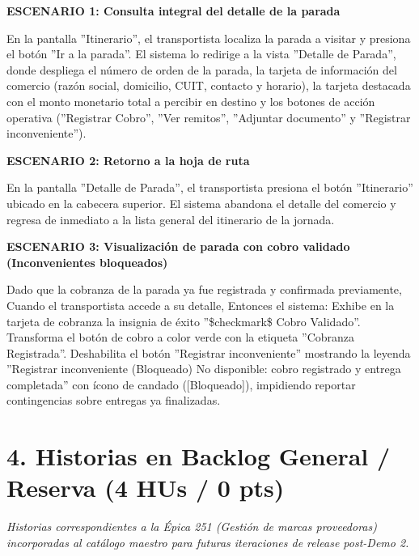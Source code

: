 \documentclass[a4paper,9pt]{article}
\begin{document}
\begin{tcolorbox}
{\footnotesize
\noindent\textbf{\textcolor{secondarydark}{ESCENARIO 1:  Consulta integral del detalle de la parada}}\par\vspace{1pt}
En la pantalla ''Itinerario'', el transportista localiza la parada a visitar y presiona el botón ''Ir a la parada''. El sistema lo redirige a la vista ''Detalle de Parada'', donde despliega el número de orden de la parada, la tarjeta de información del comercio (razón social, domicilio, CUIT, contacto y horario), la tarjeta destacada con el monto monetario total a percibir en destino y los botones de acción operativa (''Registrar Cobro'', ''Ver remitos'', ''Adjuntar documento'' y ''Registrar inconveniente'').\par\vspace{2.5pt}
\noindent\textbf{\textcolor{secondarydark}{ESCENARIO 2:  Retorno a la hoja de ruta}}\par\vspace{1pt}
En la pantalla ''Detalle de Parada'', el transportista presiona el botón ''Itinerario'' ubicado en la cabecera superior. El sistema abandona el detalle del comercio y regresa de inmediato a la lista general del itinerario de la jornada.\par\vspace{2.5pt}
\noindent\textbf{\textcolor{secondarydark}{ESCENARIO 3:  Visualización de parada con cobro validado (Inconvenientes bloqueados)}}\par\vspace{1pt}
Dado que la cobranza de la parada ya fue registrada y confirmada previamente, Cuando el transportista accede a su detalle, Entonces el sistema: Exhibe en la tarjeta de cobranza la insignia de éxito ''\$checkmark\$ Cobro Validado''. Transforma el botón de cobro a color verde con la etiqueta ''Cobranza Registrada''. Deshabilita el botón ''Registrar inconveniente'' mostrando la leyenda ''Registrar inconveniente (Bloqueado)   No disponible: cobro registrado y entrega completada'' con ícono de candado ([Bloqueado]), impidiendo reportar contingencias sobre entregas ya finalizadas.\par\vspace{2.5pt}
}\par
\end{tcolorbox}

\newpage
\section{4. Historias en Backlog General / Reserva (4 HUs / 0 pts)}
\noindent\textit{Historias correspondientes a la Épica 251 (Gestión de marcas proveedoras) incorporadas al catálogo maestro para futuras iteraciones de release post-Demo 2.}
\vspace{4pt}
\end{document}
